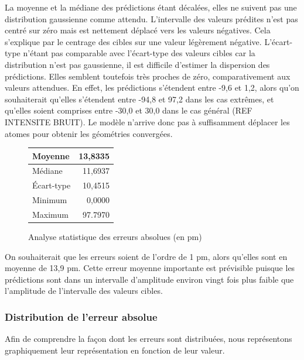 \par La moyenne et la médiane des prédictions étant décalées, elles ne suivent pas une distribution gaussienne comme attendu. L'intervalle des valeurs prédites n'est pas centré sur zéro mais est nettement déplacé vers les valeurs négatives. Cela s'explique par le centrage des cibles sur une valeur légèrement négative.
L'écart-type n'étant pas comparable avec l'écart-type des valeurs cibles car la distribution n'est pas gaussienne, il est difficile d'estimer la dispersion des prédictions. Elles semblent toutefois très proches de zéro, comparativement aux valeurs attendues. En effet, les prédictions s'étendent entre -9,6 et 1,2, alors qu'on souhaiterait qu'elles s'étendent entre -94,8 et 97,2 dans les cas extrêmes, et qu'elles soient comprises entre -30,0 et 30,0 dans le cas général (REF INTENSITE BRUIT). Le modèle  n'arrive donc pas à suffisamment déplacer les atomes pour obtenir les géométries convergées.


\begin{figure}[!h]
	\centering
	\begin{tabular}{|l|r|}
		\hline
		Moyenne & 13,8335 \\ \hline
		Médiane & 11,6937 \\ \hline
		Écart-type & 10,4515 \\ \hline
		Minimum & 0,0000 \\ \hline
		Maximum & 97.7970 \\ \hline
	\end{tabular}
	
	\caption{Analyse statistique des erreurs absolues (en pm)}
\end{figure}

\par On souhaiterait que les erreurs soient de l'ordre de 1 pm, alors qu'elles sont en moyenne de 13,9 pm. Cette erreur moyenne importante est prévisible puisque les prédictions sont dans un intervalle d'amplitude environ vingt fois plus faible que l'amplitude de l'intervalle des valeurs cibles.

\subsubsection{Distribution de l'erreur absolue}

Afin de comprendre la façon dont les erreurs sont distribuées, nous représentons graphiquement leur représentation en fonction de leur valeur.

